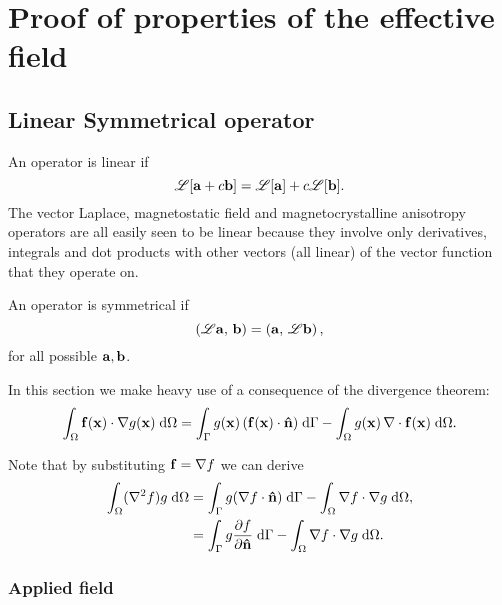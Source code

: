 \newtheorem{theorem}{Theorem}

\newcommand{\ff}{f}
\newcommand{\gf}{g}

\newcommand{\knl}{k}

\section{Proof of properties of the effective field}

\subsection{Linear Symmetrical operator}

An operator is linear if
\begin{equation}
  \mathscr{L}[{\mathbf{a}} + c{\mathbf{b}}] = \mathscr{L}[{\mathbf{a}}] + c\mathscr{L}[{\mathbf{b}}].
\end{equation}
The vector Laplace, magnetostatic field and magnetocrystalline anisotropy operators are all easily seen to be linear because they involve only derivatives, integrals and dot products with other vectors (all linear) of the vector function that they operate on.

An operator is symmetrical if
\begin{equation}
  \left(\mathscr{L} {\mathbf{a}},\, {\mathbf{b}} \right) = \left({\mathbf{a}},\, \mathscr{L} {\mathbf{b}} \right),
\end{equation}
for all possible ${\mathbf{a}}, {\mathbf{b}}$.

In this section we make heavy use of a consequence of the divergence theorem:
\begin{equation}
  \intd{\fv(\xv) \cdot \grad \gf(\xv)}
  = \intb{\gf(\xv) \, (\fv(\xv) \cdot \nv)} - \intd{\gf(\xv) \, \div \fv(\xv)}.
  \label{eqn:grad-divergence}
\end{equation}

Note that by substituting $\fv = \grad \ff$ we can derive
\begin{equation}
  \begin{aligned}
    \intd{(\lap \ff) \gf}
    &= \intb{\gf (\nabla \ff \cdot \nv)} - \intd{\nabla \ff \cdot \nabla \gf}, \\
    &= \intb{\gf \ddn{\ff}} - \intd{\nabla \ff \cdot \nabla \gf}.
    \label{eqn:laplace-divergence}
  \end{aligned}
\end{equation}

\subsubsection{Applied field}

